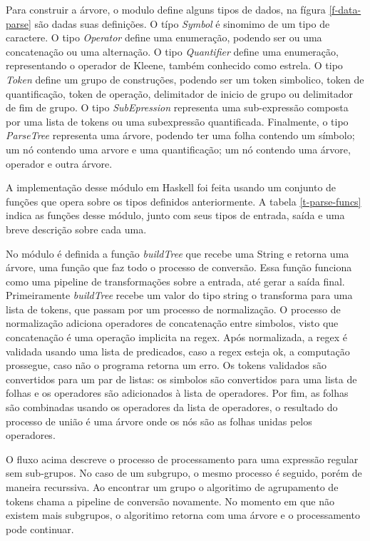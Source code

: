 Para construir a árvore, o modulo define alguns tipos de dados, na fígura \ref{f-data-parse} são dadas suas definições.
O típo \emph{Symbol} é sinomimo de um tipo de caractere.
O tipo \emph{Operator} define uma enumeração, podendo ser ou uma concatenação ou uma alternação.
O tipo \emph{Quantifier} define uma enumeração, representando o operador de Kleene, também conhecido como estrela.
O tipo \emph{Token} define um grupo de construções, podendo ser um token simbolico, token de quantificação, token de operação, delimitador de inicio de grupo ou delimitador de fim de grupo.
O tipo \emph{SubEpression} representa uma sub-expressão composta por uma lista de tokens ou uma subexpressão quantificada.
Finalmente, o tipo \emph{ParseTree} representa uma árvore, podendo ter uma folha contendo um símbolo; um nó contendo uma arvore e uma quantificação; um nó contendo uma árvore, operador e outra árvore.



A implementação desse módulo em Haskell foi feita usando um conjunto de funções que opera sobre os tipos definidos anteriormente.
A tabela \ref{t-parse-funcs} indica as funções desse módulo, junto com seus tipos de entrada, saída e uma breve descrição sobre cada uma.



No módulo é definida a função \emph{buildTree} que recebe uma String e retorna uma árvore, uma função que faz todo o processo de conversão.
Essa função funciona como uma pipeline de transformações sobre a entrada, até gerar a saída final.
Primeiramente \emph{buildTree} recebe um valor do tipo string o transforma para uma lista de tokens, que passam por um processo de normalização.
O processo de normalização adiciona operadores de concatenação entre simbolos, visto que concatenação é uma operação implicita na regex.
Após normalizada, a regex é validada usando uma lista  de predicados, caso a regex esteja ok, a computação prossegue, caso não o programa retorna um erro.
Os tokens validados são convertidos para um par de listas: os simbolos são convertidos para uma lista de folhas e os operadores são adicionados à lista de operadores.
Por fim, as folhas são combinadas usando os operadores da lista de operadores, o resultado do processo de união é uma árvore onde os nós são as folhas unidas pelos operadores.

O fluxo acima descreve o processo de processamento para uma expressão regular sem sub-grupos.
No caso de um subgrupo, o mesmo processo é seguido, porém de maneira recurssiva.
Ao encontrar um grupo o algoritimo de agrupamento de tokens chama a pipeline de conversão novamente.
No momento em que não existem mais subgrupos, o algoritimo retorna com uma árvore e o processamento pode continuar.

